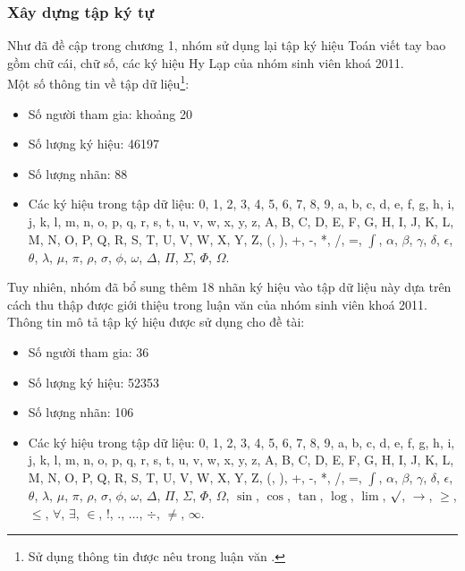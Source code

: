 \documentclass[a4paper,12pt]{article}
\begin{document}
	\subsubsection{Xây dựng tập ký tự}
	Như đã đề cập trong chương 1, nhóm sử dụng lại tập ký hiệu Toán viết tay bao gồm chữ cái, chữ số, các ký hiệu Hy Lạp của nhóm sinh viên khoá 2011\cite{qak}.\\
	Một số thông tin về tập dữ liệu\footnote{Sử dụng thông tin được nêu trong luận văn \cite{qak}.}:
	\begin{itemize}
		\item Số người tham gia: khoảng 20
		\item Số lượng ký hiệu: 46197
		\item Số lượng nhãn: 88
		\item Các ký hiệu trong tập dữ liệu: 0, 1, 2, 3, 4, 5, 6, 7, 8, 9, a, b, c, d, e, f, g, h, i,
		j, k, l, m, n, o, p, q, r, s, t, u, v, w, x, y, z, A, B, C, D, E, F, G, H, I, J, K, L, M, N, O, P, Q, R, S, T, U, V, W, X, Y, Z, (, ), +, -, *, /, =, $\int$, $\alpha$, $\beta$, $\gamma$, $\delta$, $\epsilon$, $\theta$, $\lambda$, $\mu$, $\pi$, $\rho$, $\sigma$, $\phi$, $\omega$, $\Delta$, $\Pi$, $\Sigma$, $\Phi$, $\Omega$.
	\end{itemize}
	Tuy nhiên, nhóm đã bổ sung thêm 18 nhãn ký hiệu vào tập dữ liệu này dựa trên cách thu thập được giới thiệu trong luận văn của nhóm sinh viên khoá 2011\cite{qak}.\\
	Thông tin mô tả tập ký hiệu được sử dụng cho đề tài:
	\begin{itemize}
		\item Số người tham gia: 36
		\item Số lượng ký hiệu: 52353
		\item Số lượng nhãn: 106
		\item Các ký hiệu trong tập dữ liệu: 0, 1, 2, 3, 4, 5, 6, 7, 8, 9, a, b, c, d, e, f, g, h, i, j, k, l, m, n, o, p, q, r, s, t, u, v, w, x, y, z, A, B, C, D, E, F, G, H, I, J, K, L, M, N, O, P, Q, R, S, T, U, V, W, X, Y, Z, (, ), +, -, *, /, =, $\int$, $\alpha$, $\beta$, $\gamma$, $\delta$, $\epsilon$, $\theta$, $\lambda$, $\mu$, $\pi$, $\rho$, $\sigma$, $\phi$, $\omega$, $\Delta$, $\Pi$, $\Sigma$, $\Phi$, $\Omega$, $\sin$, $\cos$, $\tan$, $\log$, $\lim$, $\surd$, $\rightarrow$, $\geq$, $\leq$, $\forall$, $\exists$, $\in$, !, ., $\ldots$, $\div$, $\neq$, $\infty$.
		
	\end{itemize}
\end{document}
